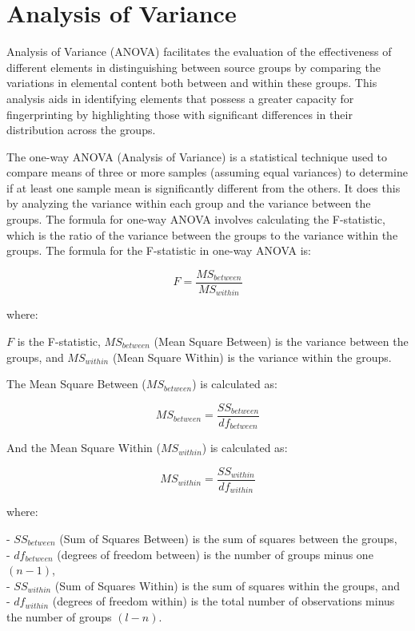 \documentclass[12pt]{report}
\begin{document}
\section{Analysis of Variance}
Analysis of Variance (ANOVA) facilitates the evaluation of the effectiveness of different elements in distinguishing between source groups by comparing the variations in elemental content both between and within these groups. This analysis aids in identifying elements that possess a greater capacity for fingerprinting by highlighting those with significant differences in their distribution across the groups.

The one-way ANOVA (Analysis of Variance) is a statistical technique used to compare means of three or more samples (assuming equal variances) to determine if at least one sample mean is significantly different from the others. It does this by analyzing the variance within each group and the variance between the groups. The formula for one-way ANOVA involves calculating the F-statistic, which is the ratio of the variance between the groups to the variance within the groups. The formula for the F-statistic in one-way ANOVA is:

\begin{equation}
    F = \frac{MS_{between}}{MS_{within}}    
\end{equation}

where:

$F$ is the F-statistic, $MS_{between}$ (Mean Square Between) is the variance between the groups, and $MS_{within}$ (Mean Square Within) is the variance within the groups.

The Mean Square Between ($MS_{between}$) is calculated as:

\begin{equation}
    MS_{between} = \frac{SS_{between}}{df_{between}}    
\end{equation}

And the Mean Square Within ($MS_{within}$) is calculated as:

\begin{equation}
    MS_{within} = \frac{SS_{within}}{df_{within}}    
\end{equation}

where:

- $SS_{between}$ (Sum of Squares Between) is the sum of squares between the groups, \\
- $df_{between}$ (degrees of freedom between) is the number of groups minus one $(n - 1)$, \\
 - $SS_{within}$ (Sum of Squares Within) is the sum of squares within the groups, and \\
- $df_{within}$ (degrees of freedom within) is the total number of observations minus the number of groups $(l - n)$.
\end{document}
